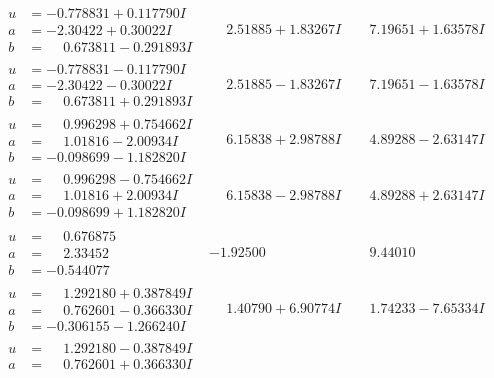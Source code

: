 \documentclass[1p]{elsarticle_modified}
\theoremstyle{definition}
\begin{document}
$$\begin{array}{c|c|c}
\begin{aligned}
u &= -0.778831 + 0.117790 I \\
a &= -2.30422 + 0.30022 I \\
b &= \phantom{-}0.673811 - 0.291893 I\end{aligned}
 & \phantom{-}2.51885 + 1.83267 I & \phantom{-}7.19651 + 1.63578 I \\ \hline\begin{aligned}
u &= -0.778831 - 0.117790 I \\
a &= -2.30422 - 0.30022 I \\
b &= \phantom{-}0.673811 + 0.291893 I\end{aligned}
 & \phantom{-}2.51885 - 1.83267 I & \phantom{-}7.19651 - 1.63578 I \\ \hline\begin{aligned}
u &= \phantom{-}0.996298 + 0.754662 I \\
a &= \phantom{-}1.01816 - 2.00934 I \\
b &= -0.098699 - 1.182820 I\end{aligned}
 & \phantom{-}6.15838 + 2.98788 I & \phantom{-}4.89288 - 2.63147 I \\ \hline\begin{aligned}
u &= \phantom{-}0.996298 - 0.754662 I \\
a &= \phantom{-}1.01816 + 2.00934 I \\
b &= -0.098699 + 1.182820 I\end{aligned}
 & \phantom{-}6.15838 - 2.98788 I & \phantom{-}4.89288 + 2.63147 I \\ \hline\begin{aligned}
u &= \phantom{-}0.676875\phantom{ +0.000000I} \\
a &= \phantom{-}2.33452\phantom{ +0.000000I} \\
b &= -0.544077\phantom{ +0.000000I}\end{aligned}
 & -1.92500\phantom{ +0.000000I} & \phantom{-}9.44010\phantom{ +0.000000I} \\ \hline\begin{aligned}
u &= \phantom{-}1.292180 + 0.387849 I \\
a &= \phantom{-}0.762601 - 0.366330 I \\
b &= -0.306155 - 1.266240 I\end{aligned}
 & \phantom{-}1.40790 + 6.90774 I & \phantom{-}1.74233 - 7.65334 I \\ \hline\begin{aligned}
u &= \phantom{-}1.292180 - 0.387849 I \\
a &= \phantom{-}0.762601 + 0.366330 I \\

\end{aligned}
\end{array}$$
\end{document}
